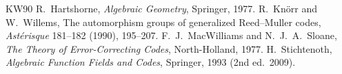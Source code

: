 \documentclass[12pt,letterpaper]{article}
\begin{document}
\begin{thebibliography}{KW90}
 R.~Hartshorne, \emph{Algebraic Geometry}, Springer, 1977.
 R.~Kn\"orr and W.~Willems, The automorphism groups of
generalized Reed--Muller codes, \emph{Ast\'erisque} 181--182 (1990), 195--207.
 F.~J.~MacWilliams and N.~J.~A.~Sloane, \emph{The Theory of
Error-Correcting Codes}, North-Holland, 1977.
 H.~Stichtenoth, \emph{Algebraic Function Fields and Codes},
Springer, 1993 (2nd ed.\ 2009).
\end{thebibliography}
\end{document}
